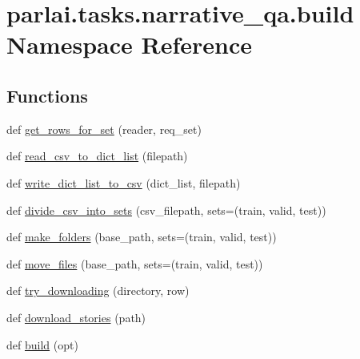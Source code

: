 \hypertarget{namespaceparlai_1_1tasks_1_1narrative__qa_1_1build}{}\section{parlai.\+tasks.\+narrative\+\_\+qa.\+build Namespace Reference}
\label{namespaceparlai_1_1tasks_1_1narrative__qa_1_1build}
\subsection*{Functions}
\begin{DoxyCompactItemize}
\item 
def \hyperlink{namespaceparlai_1_1tasks_1_1narrative__qa_1_1build_a8d4e1f30e3de3f62c039296cbed12e8d}{get\+\_\+rows\+\_\+for\+\_\+set} (reader, req\+\_\+set)
\item 
def \hyperlink{namespaceparlai_1_1tasks_1_1narrative__qa_1_1build_a7fae633ea705d970c2a6d56b7004f6cd}{read\+\_\+csv\+\_\+to\+\_\+dict\+\_\+list} (filepath)
\item 
def \hyperlink{namespaceparlai_1_1tasks_1_1narrative__qa_1_1build_ab49502ac724edd933f89bec8f414b452}{write\+\_\+dict\+\_\+list\+\_\+to\+\_\+csv} (dict\+\_\+list, filepath)
\item 
def \hyperlink{namespaceparlai_1_1tasks_1_1narrative__qa_1_1build_a104cbf949215e7b505c73b33017b1970}{divide\+\_\+csv\+\_\+into\+\_\+sets} (csv\+\_\+filepath, sets=(\textquotesingle{}train\textquotesingle{}, \textquotesingle{}valid\textquotesingle{}, \textquotesingle{}test\textquotesingle{}))
\item 
def \hyperlink{namespaceparlai_1_1tasks_1_1narrative__qa_1_1build_a602f90b82e6c6eafbd13647ba7567101}{make\+\_\+folders} (base\+\_\+path, sets=(\textquotesingle{}train\textquotesingle{}, \textquotesingle{}valid\textquotesingle{}, \textquotesingle{}test\textquotesingle{}))
\item 
def \hyperlink{namespaceparlai_1_1tasks_1_1narrative__qa_1_1build_a53e5ef8d085ebdfc1cc6c4918841d097}{move\+\_\+files} (base\+\_\+path, sets=(\textquotesingle{}train\textquotesingle{}, \textquotesingle{}valid\textquotesingle{}, \textquotesingle{}test\textquotesingle{}))
\item 
def \hyperlink{namespaceparlai_1_1tasks_1_1narrative__qa_1_1build_a9af345566fd27c286f7fef146b2cf00b}{try\+\_\+downloading} (directory, row)
\item 
def \hyperlink{namespaceparlai_1_1tasks_1_1narrative__qa_1_1build_afd6f28e1efb7e9f3328eef166f8be5cb}{download\+\_\+stories} (path)
\item 
def \hyperlink{namespaceparlai_1_1tasks_1_1narrative__qa_1_1build_a51a4aace1ca9f9cbdc332405edaf1ef5}{build} (opt)
\end{DoxyCompactItemize}
